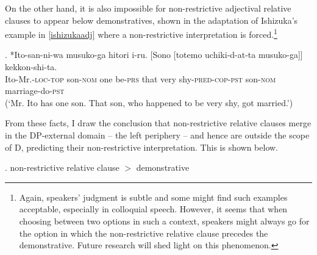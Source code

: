 \documentclass [output=book,colorlinks,citecolor=brown]{langscibook}
\begin{document}
On the other hand, it is also impossible for non-restrictive adjectival relative clauses to appear below demonstratives, shown in the adaptation of Ishizuka's example in \ref{ishizukaadj} where a non-restrictive interpretation is forced.\footnote{Again, speakers' judgment is subtle and some might find such examples acceptable, especially in colloquial speech. However, it seems that when choosing between two options in such a context, speakers might always go for the option in which the non-restrictive relative clause precedes the demonstrative. Future research will shed light on this phenomenon.}

\exg. *Ito-san-ni-wa musuko-ga hitori i-ru. [Sono [totemo uchiki-d-at-ta musuko-ga]] kekkon-shi-ta.\\
Ito-Mr.-\textsc{loc-top} son-\textsc{nom} one be-\textsc{prs} that very shy-\textsc{pred-cop-pst} son-\textsc{nom} marriage-do-\textsc{pst}\\
(`Mr. Ito has one son. That son, who happened to be very shy, got married.’) \label{ishizukaadj}

From these facts, I draw the conclusion that non-restrictive relative clauses merge in the DP-external domain -- the left periphery -- and hence are outside the scope of D, predicting their non-restrictive interpretation. This is shown below. %

 \ex. non-restrictive relative clause $>$ demonstrative \\
\end{document}
